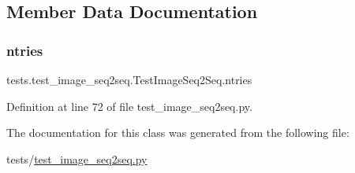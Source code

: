\subsection{Member Data Documentation}
\mbox{\label{classtests_1_1test__image__seq2seq_1_1TestImageSeq2Seq_aecd5dc0103c55c932f753360772de6f7}} 
\subsubsection{\texorpdfstring{ntries}{ntries}}
{\footnotesize\ttfamily tests.\+test\+\_\+image\+\_\+seq2seq.\+Test\+Image\+Seq2\+Seq.\+ntries\hspace{0.3cm}{\ttfamily [static]}}



Definition at line 72 of file test\+\_\+image\+\_\+seq2seq.\+py.



The documentation for this class was generated from the following file\+:\begin{DoxyCompactItemize}
\item 
tests/\hyperlink{test__image__seq2seq_8py}{test\+\_\+image\+\_\+seq2seq.\+py}\end{DoxyCompactItemize}
